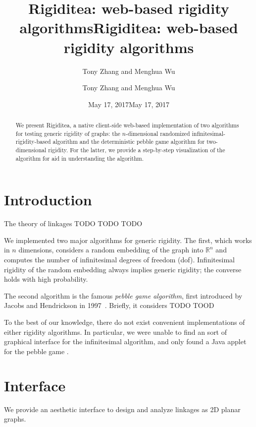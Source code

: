 \documentclass[aps,final,twocolumn,letterpaper,nofootinbib]{revtex4-1}
\title{Rigiditea: web-based rigidity algorithms}
\author{Tony Zhang and Menghua Wu}
\date{May 17, 2017}
\newcommand\RR{\mathbb{R}}
\newcommand\headers{
    \title{Rigiditea: web-based rigidity algorithms}
    \author{Tony Zhang and Menghua Wu}
    \date{May 17, 2017}    
    \begin{abstract}
        We present Rigiditea,
        a native client-side web-based implementation of two algorithms
        for testing generic rigidity of graphs:
        the $n$-dimensional randomized infinitesimal-rigidity-based algorithm
        and the deterministic pebble game algorithm for two-dimensional rigidity.
        For the latter, we provide a step-by-step visualization of the algorithm
        for aid in understanding the algorithm.
    \end{abstract}
}
\begin{document}
\ifrevtex\headers\fi

\maketitle




\tableofcontents

\section{Introduction}

The theory of linkages TODO TODO TODO

We implemented two major algorithms for generic rigidity.
The first, which works in $n$ dimensions,
considers a random embedding of the graph into $\RR^n$
and computes the number of infinitesimal degrees of freedom (dof).
Infinitesimal rigidity of the random embedding always implies generic rigidity;
the converse holds with high probability.

The second algorithm is the famous \emph{pebble game algorithm},
first introduced by Jacobs and Hendrickson in 1997~\cite{jacobs97}.
Briefly, it considers TODO TOOD

To the best of our knowledge,
there do not exist convenient implementations of
either rigidity algorithms.
In particular,
we were unable to find an sort of graphical interface
for the infinitesimal algorithm,
and only found a Java applet for the pebble game \cite{stjohnapplet}.


\section{Interface}

We provide an aesthetic interface
to design and analyze linkages as 2D planar graphs.
\end{document}
